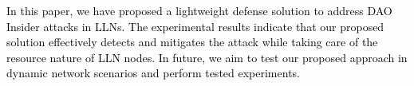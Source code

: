 \documentclass[conference, a4paper]{IEEEtran}
\begin{document}
\textcolor{black}{In this paper, we have proposed a lightweight defense solution to address DAO Insider attacks in LLNs.  The experimental results indicate that our proposed solution effectively detects and mitigates the attack while taking care of the resource nature of LLN nodes. In future, we aim to test our proposed approach in dynamic network scenarios and perform tested experiments.}  



\end{document}
